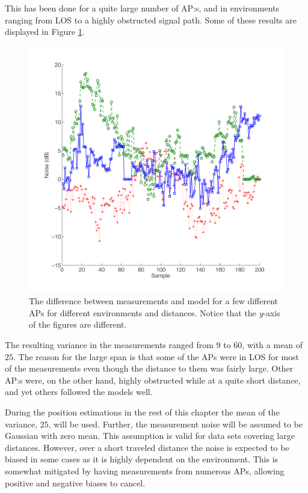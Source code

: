 \documentclass{LTHthesis}
\begin{document}
This has been done for a quite large number of AP:s, and in environments ranging from LOS to a highly obstructed signal path. Some of these results are displayed in Figure \ref{noise_behaviour}. 
%
\begin{figure}[!hbt]

\includegraphics[width=1\textwidth ]{images/pure_rssi/noise_behaviour}
\caption{The difference between measurements and model for a few different APs for different environments and distances. Notice that the \emph{y}-axis of the figures are different.}\label{noise_behaviour}
\end{figure}

The resulting variance in the measurements ranged from $9$ to $60$, with a mean of $25$. The reason for the large span is that some of the APs were in LOS for most of the measurements even though the distance to them was fairly large. Other AP:s were, on the other hand, highly obstructed while at a quite short distance, and yet others followed the models well. 

During the position estimations in the rest of this chapter the mean of the variance, $25$, will be used. Further, the measurement noise will be assumed to be Gaussian with zero mean. This assumption is valid for data sets covering large distances. However, over a short traveled distance the noise is expected to be biased in some cases as it is highly dependent on the environment. This is somewhat mitigated by having measurements from numerous APs, allowing positive and negative biases to cancel.
\end{document}
